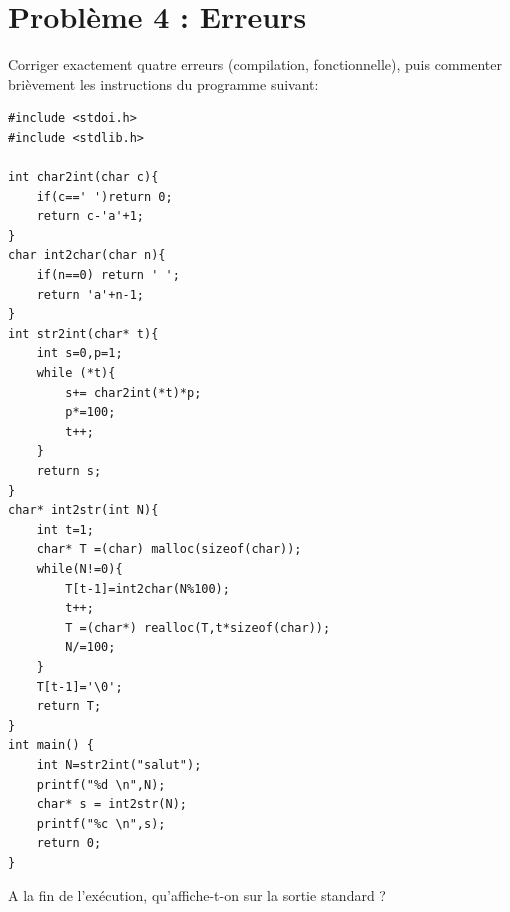 \documentclass{article}
\begin{document}
\section*{Problème 4 : Erreurs}
Corriger exactement quatre erreurs (compilation, fonctionnelle), puis commenter
brièvement les instructions du programme suivant:
\begin{verbatim}
#include <stdoi.h>
#include <stdlib.h>

int char2int(char c){
    if(c==' ')return 0;
    return c-'a'+1;
}
char int2char(char n){
    if(n==0) return ' ';
    return 'a'+n-1;
}
int str2int(char* t){
    int s=0,p=1;
    while (*t){
        s+= char2int(*t)*p;
        p*=100;
        t++;
    }
    return s;
}
char* int2str(int N){
    int t=1;
    char* T =(char) malloc(sizeof(char));
    while(N!=0){
        T[t-1]=int2char(N%100);
        t++;
        T =(char*) realloc(T,t*sizeof(char));
        N/=100;
    }
    T[t-1]='\0';
    return T;
}
int main() {
    int N=str2int("salut");
    printf("%d \n",N);
    char* s = int2str(N);
    printf("%c \n",s);
    return 0;
}

\end{verbatim}
A la fin de l'exécution, qu'affiche-t-on sur la sortie standard ?
\end{document}
